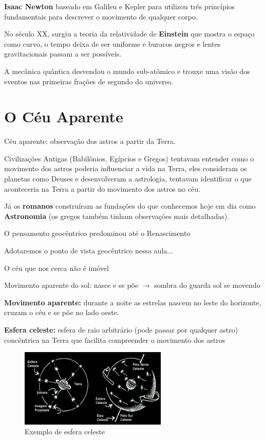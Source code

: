 \documentclass{article}
\begin{document}
\textbf{Isaac Newton} baseado em Galileu e Kepler para utilizou três princípios 
fundamentais para descrever o movimento de qualquer corpo.

No século XX, surgiu a teoria da relatividade de \textbf{Einstein} que mostra
o espaço como curvo, o tempo deixa de ser uniforme e buracos negros 
e lentes gravitacionais passam a ser possíveis.

A mecânica quântica desvendou o mundo sub-atômico e trouxe uma visão
dos eventos nas primeiras frações de segundo do universo.

\section{O Céu Aparente}

Céu aparente: observação dos astros a partir da Terra.

Civilizações Antigas (Babilônios, Egípcios e Gregos) tentavam 
entender como o movimento dos astros poderia influenciar a vida 
na Terra, eles consideram os planetas como Deuses e desenvolveram
a astrologia, tentavam identificar o que aconteceria na Terra a partir
do movimento dos astros no céu.

Já os \textbf{romanos} construíram as fundações do que conhecemos 
hoje em dia como \textbf{Astronomia} (os gregos também tinham observações
mais detalhadas).

O pensamento geocêntrico predominou até o Renascimento

Adotaremos o ponto de vista geocêntrico nessa aula...

O céu que nos cerca não é imóvel

Movimento aparente do sol: nasce e se põe $\rightarrow$ sombra do 
guarda sol se movendo

\textbf{Movimento aparente:} durante a noite as estrelas nascem no leste do
horizonte, cruzam o céu e se põe no lado oeste.

\textbf{Esfera celeste:} esfera de raio arbitrário (pode passar por
qualquer astro) concêntrica na 
Terra que facilita compreender o movimento dos astros 

\begin{figure}[H]
    \centering
    \includegraphics[width=7cm]{imagens/esfera_celeste.png}
    \caption{Exemplo de esfera celeste}
\end{figure}
\end{document}
